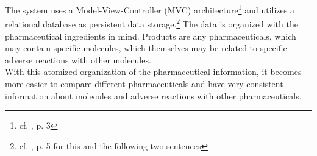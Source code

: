 \\
\\
The system uses a Model-View-Controller (MVC) architecture\footnote{cf. \cite{Dehling.2012}, p. 3} and utilizes a relational database as persistent data storage.\footnote{cf. \cite{Dehling.2012}, p. 5 for this and the following two sentences} The data is organized with the pharmaceutical ingredients in mind. Products are any pharmaceuticals, which may contain specific molecules, which themselves may be related to specific adverse reactions with other molecules. 
\\
With this atomized organization of the pharmaceutical information, it becomes more easier to compare different pharmaceuticals and have very consistent information about molecules and adverse reactions with other pharmaceuticals.

